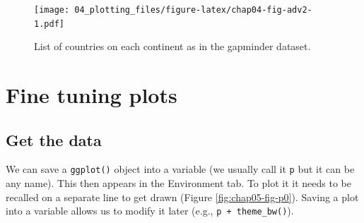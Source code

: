 \documentclass[
  12pt,
  krantz2]{krantz}
\makeatletter
\newenvironment{Shaded}{\begin{snugshade}}{\end{snugshade}}
\newcommand{\DataTypeTok}[1]{\textcolor[rgb]{0.13,0.29,0.53}{#1}}
\newcommand{\DecValTok}[1]{\textcolor[rgb]{0.00,0.00,0.81}{#1}}
\newcommand{\KeywordTok}[1]{\textcolor[rgb]{0.13,0.29,0.53}{\textbf{#1}}}
\newcommand{\NormalTok}[1]{#1}
\newcommand{\OperatorTok}[1]{\textcolor[rgb]{0.81,0.36,0.00}{\textbf{#1}}}
\newcommand{\OtherTok}[1]{\textcolor[rgb]{0.56,0.35,0.01}{#1}}
\newcommand{\StringTok}[1]{\textcolor[rgb]{0.31,0.60,0.02}{#1}}
\newenvironment{kframe}{%
\medskip{}
\setlength{\fboxsep}{.8em}
 \def\at@end@of@kframe{}%
 \ifinner\ifhmode%
  \def\at@end@of@kframe{\end{minipage}}%
  \begin{minipage}{\columnwidth}%
 \fi\fi%
 \def\FrameCommand##1{\hskip\@totalleftmargin \hskip-\fboxsep
 \colorbox{shadecolor}{##1}\hskip-\fboxsep
     \hskip-\linewidth \hskip-\@totalleftmargin \hskip\columnwidth}%
 \MakeFramed {\advance\hsize-\width
   \@totalleftmargin\z@ \linewidth\hsize
   \@setminipage}}%
 {\par\unskip\endMakeFramed%
 \at@end@of@kframe}
\renewenvironment{Shaded}{\begin{kframe}}{\end{kframe}}
\makeatother
\begin{document}
\begin{Shaded}
\end{Shaded}

\begin{figure}
\centering
\texttt{[image: 04\_plotting\_files/figure-latex/chap04-fig-adv2-1.pdf]}
\caption{\label{fig:chap04-fig-adv2}List of countries on each continent as in the gapminder dataset.}
\end{figure}

\hypertarget{finetuning}{%
\chapter{Fine tuning plots}\label{finetuning}}


\hypertarget{get-the-data-1}{%
\section{Get the data}\label{get-the-data-1}}

We can save a \texttt{ggplot()} object into a variable (we usually call it \texttt{p} but it can be any name).
This then appears in the Environment tab.
To plot it it needs to be recalled on a separate line to get drawn (Figure \ref{fig:chap05-fig-p0}).
Saving a plot into a variable allows us to modify it later (e.g., \texttt{p\ +\ theme\_bw()}).
\end{document}
